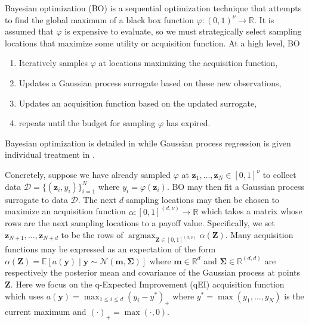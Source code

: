 \documentclass[graybox]{svmult}
\begin{document}
Bayesian optimization (BO) is a sequential optimization technique that attempts to find the global maximum of a black box function $\varphi: (0,1)^{\nu} \to \mathbb{R}$. It is assumed that $\varphi$ is expensive to evaluate, so we must strategically select sampling locations that maximize some utility or acquisition function. At a high level, BO 
\begin{enumerate}
    \item Iteratively samples $\varphi$ at locations maximizing the acquisition function,
    \item Updates a Gaussian process surrogate based on these new observations,
    \item Updates an acquisition function based on the updated surrogate,
    \item repeats until the budget for sampling $\varphi$ has expired.
\end{enumerate}
Bayesian optimization is detailed in \cite{snoek2012practical} while Gaussian process regression is given individual treatment in \cite{rasmussen2006gaussian}.

Concretely, suppose we have already sampled $\varphi$ at $\boldsymbol{z}_1,\dots,\boldsymbol{z}_{N} \in [0,1]^{\nu}$ to collect data $\mathcal{D}=\{(\boldsymbol{z}_i,y_i)\}_{i=1}^N$ where $y_i = \varphi(\boldsymbol{z}_i)$. BO may then fit a Gaussian process surrogate to data $\mathcal{D}$. The next $d$ sampling locations may then be chosen to maximize an acquisition function $\alpha: [0,1]^{(d,\nu)} \to \mathbb{R}$ which takes a matrix whose rows are the next sampling locations to a payoff value. Specifically, we set $\boldsymbol{z}_{N+1}, \dots, \boldsymbol{z}_{N+d}$ to be the rows of $\mathop{\text{argmax}}_{\boldsymbol{Z} \in [0,1]^{(d,\nu)}}\alpha(\boldsymbol{Z})$. Many acquisition functions may be expressed as an expectation of the form $\alpha(\boldsymbol{Z}) = \mathbb{E}\left[a(\boldsymbol{y}) \mid \boldsymbol{y} \sim \mathcal{N}\left(\boldsymbol{m},\boldsymbol{\Sigma}\right)\right]$ where $\boldsymbol{m} \in \mathbb{R}^{d}$ and  $\boldsymbol{\Sigma} \in \mathbb{R}^{(d,d)}$ are respectively the posterior mean and covariance of the Gaussian process at points $\boldsymbol{Z}$. Here we focus on the q-Expected Improvement (qEI) acquisition function which uses $a(\boldsymbol{y}) = \max_{1 \leq i \leq d} (y_i - y^*)_+$ where $y^*= \max\left(y_1,\dots,y_N\right)$ is the current maximum and $(\cdot)_+ = \max(\cdot,0)$. 
\end{document}
